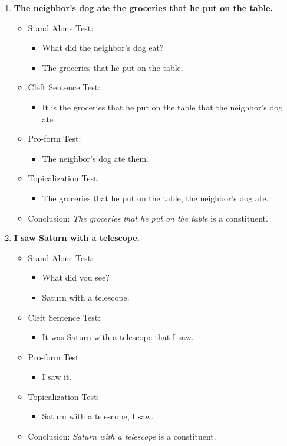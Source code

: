 \documentclass[12pt]{article}
\begin{document}
\begin{enumerate}
   \item \textbf{The neighbor's dog ate \underline{the groceries that he put on the table}.}
   \begin{itemize}
       \item Stand Alone Test:
       \begin{itemize}
           \item What did the neighbor's dog eat?
           \item The groceries that he put on the table.
       \end{itemize}
       \item Cleft Sentence Test:
       \begin{itemize}
           \item It is the groceries that he put on the table that the neighbor’s dog ate.
       \end{itemize}
       \item Pro-form Test:
       \begin{itemize}
           \item The neighbor’s dog ate them.
       \end{itemize}
       \item Topicalization Test:
       \begin{itemize}
           \item The groceries that he put on the table, the neighbor's dog ate.
       \end{itemize}
       \item Conclusion: \textit{The groceries that he put on the table} is a constituent.
   \end{itemize}

   \item \textbf{I saw \underline{Saturn with a telescope}.}
   \begin{itemize}
       \item Stand Alone Test:
       \begin{itemize}
           \item What did you see?
           \item Saturn with a telescope.
       \end{itemize}
       \item Cleft Sentence Test:
       \begin{itemize}
           \item It was Saturn with a telescope that I saw.
       \end{itemize}
       \item Pro-form Test:
       \begin{itemize}
           \item I saw it.
       \end{itemize}
       \item Topicalization Test:
       \begin{itemize}
           \item Saturn with a telescope, I saw.
       \end{itemize}
       \item Conclusion: \textit{Saturn with a telescope} is a constituent.
   \end{itemize}


\end{enumerate}
\end{document}
